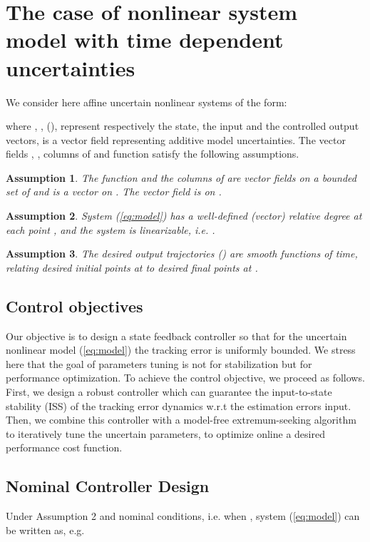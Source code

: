 \documentclass[twoside,leqno,onecolumn]{article}
\newtheorem{assumption}{Assumption}
\begin{document}
\section{The case of nonlinear system model with time dependent
uncertainties} We consider here affine uncertain nonlinear systems
of the form:

where , , 
(), represent respectively the state, the input and the
controlled output vectors,  is a vector field
representing additive model uncertainties. The vector fields ,
, columns of  and function  satisfy the following
assumptions.

\begin{assumption}
The function  and the
columns of  are
 vector fields on a bounded set  of
 and  is
a  vector on . The vector field  is  on .
\end{assumption}

\begin{assumption}
System (\ref{eq:model}) has a well-defined (vector) relative
degree  at each point , and
the system is linearizable, i.e. .
\end{assumption}



\begin{assumption}
The desired output trajectories  () are
smooth functions of time, relating desired initial points
 at  to desired final points  at
.
\end{assumption}

\subsection{Control objectives}
Our objective is to design a state feedback controller  so
that  for the uncertain nonlinear model (\ref{eq:model}) the
tracking error is uniformly bounded. We stress here that the goal
of parameters tuning is not for stabilization but for performance
optimization. To achieve the control objective, we proceed as
follows. First, we design a robust controller which can guarantee
the input-to-state stability (ISS) of the tracking error dynamics
w.r.t the estimation errors input. Then, we combine this
controller with a model-free extremum-seeking algorithm to
iteratively tune the uncertain parameters, to optimize online a
desired performance cost function.



\subsection{Nominal Controller Design} \label{sec:norm}
Under Assumption 2 and nominal conditions, i.e. when , system (\ref{eq:model}) can be written as, e.g.
\cite{I89}
\end{document}
